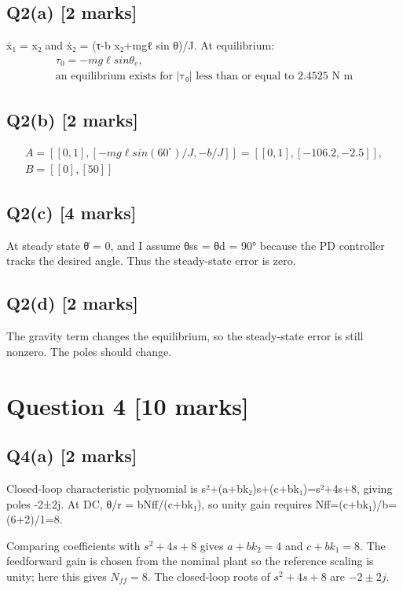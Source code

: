 \documentclass[11pt,a4paper]{article}
\begin{document}
\subsection*{Q2(a) \hfill [2 marks]}

ẋ₁ = x₂ and ẋ₂ = (τ-b x₂+mgℓ sin θ)/J.
At equilibrium:\[\begin{aligned}τ_0 = -mg\ell sin \theta_e,\\ \text{an equilibrium exists for |τ₀| less than or equal to 2.4525 N m}\end{aligned}\]

\subsection*{Q2(b) \hfill [2 marks]}

\[\begin{aligned}A = [[0,1], [-mg\ell sin(60^{\circ})/J, -b/J]] = [[0,1], [-106.2, -2.5]],\\ B = [[0],[50]]\end{aligned}\]

\subsection*{Q2(c) \hfill [4 marks]}

At steady state θ̇ = 0, and I assume θss = θd = 90° because the PD controller tracks the desired angle.
Thus the steady-state error is zero.

\subsection*{Q2(d) \hfill [2 marks]}

The gravity term changes the equilibrium, so the steady-state error is still nonzero.
The poles should change.

\section*{Question 4 \hfill [10 marks]}
\subsection*{Q4(a) \hfill [2 marks]}

Closed-loop characteristic polynomial is s²+(a+bk₂)s+(c+bk₁)=s²+4s+8, giving poles -2±2j.
At DC, θ/r = bNff/(c+bk₁), so unity gain requires Nff=(c+bk₁)/b=(6+2)/1=8.\par\smallskip Comparing coefficients with $s^2+4s+8$ gives $a+bk_2=4$ and $c+bk_1=8$. The feedforward gain is chosen from the nominal plant so the reference scaling is unity; here this gives $N_{ff}=8$. The closed-loop roots of $s^2+4s+8$ are $-2\pm2j$.
\end{document}
